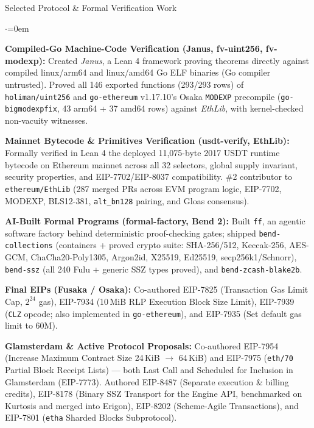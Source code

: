\documentclass[10pt]{resume}
\begin{document}
\begin{rSection}{Selected Protocol \& Formal Verification Work}
\begin{list}{$\cdot$}{\leftmargin=0em}
	\setlength{\itemsep}{-0.35em} \vspace{-0.4em}
	\item \textbf{Compiled-Go Machine-Code Verification (Janus, fv-uint256, fv-modexp):} Created \textit{Janus}, a Lean 4 framework proving theorems directly against compiled linux/arm64 and linux/amd64 Go ELF binaries (Go compiler untrusted). Proved all 146 exported functions (293/293 rows) of \texttt{holiman/uint256} and \texttt{go-ethereum} v1.17.10's Osaka \texttt{MODEXP} precompile (\texttt{go-bigmodexpfix}, 43 arm64 + 37 amd64 rows) against \textit{EthLib}, with kernel-checked non-vacuity witnesses.
	\item \textbf{Mainnet Bytecode \& Primitives Verification (usdt-verify, EthLib):} Formally verified in Lean 4 the deployed 11,075-byte 2017 USDT runtime bytecode on Ethereum mainnet across all 32 selectors, global supply invariant, security properties, and EIP-7702/EIP-8037 compatibility. \#2 contributor to \texttt{ethereum/EthLib} (287 merged PRs across EVM program logic, EIP-7702, MODEXP, BLS12-381, \texttt{alt\_bn128} pairing, and Gloas consensus).
	\item \textbf{AI-Built Formal Programs (formal-factory, Bend 2):} Built \texttt{ff}, an agentic software factory behind deterministic proof-checking gates; shipped \texttt{bend-collections} (containers + proved crypto suite: SHA-256/512, Keccak-256, AES-GCM, ChaCha20-Poly1305, Argon2id, X25519, Ed25519, secp256k1/Schnorr), \texttt{bend-ssz} (all 240 Fulu + generic SSZ types proved), and \texttt{bend-zcash-blake2b}.
	\item \textbf{Final EIPs (Fusaka / Osaka):} Co-authored EIP-7825 (Transaction Gas Limit Cap, $2^{24}$ gas), EIP-7934 (10\,MiB RLP Execution Block Size Limit), EIP-7939 (\texttt{CLZ} opcode; also implemented in \texttt{go-ethereum}), and EIP-7935 (Set default gas limit to 60M).
	\item \textbf{Glamsterdam \& Active Protocol Proposals:} Co-authored EIP-7954 (Increase Maximum Contract Size 24\,KiB $\to$ 64\,KiB) and EIP-7975 (\texttt{eth/70} Partial Block Receipt Lists) --- both Last Call and Scheduled for Inclusion in Glamsterdam (EIP-7773). Authored EIP-8487 (Separate execution \& billing credits), EIP-8178 (Binary SSZ Transport for the Engine API, benchmarked on Kurtosis and merged into Erigon), EIP-8202 (Scheme-Agile Transactions), and EIP-7801 (\texttt{etha} Sharded Blocks Subprotocol).
\end{list}
\end{rSection}
\end{document}
